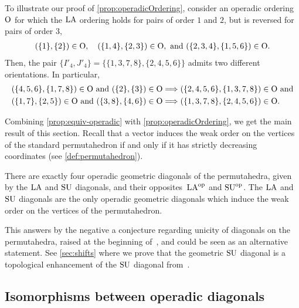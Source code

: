 \begin{example} 
\label{ex:Non-coherent order contradiction}
To illustrate our proof of \cref{prop:operadicOrdering}, consider an operadic ordering $\mathrm{O}$ for which the $\mathrm{LA}$ ordering holds for pairs of order $1$ and $2$, but is reversed for pairs of order $3$, \ie
\begin{align*}
(\{1\}, \{2\}) \in \mathrm{O}, \quad (\{1,4\}, \{2,3\}) \in \mathrm{O}, \text{ and } (\{2, 3, 4\}, \{1, 5, 6 \}) \in \mathrm{O}.
\end{align*}
Then, the pair $\{I'_4,J'_4\}=\{\{1, 3, 7, 8\}, \{2, 4, 5, 6\}\}$ admits two different orientations.
In particular, 
\begin{align*}
(\{ 4, 5, 6 \} , \{1, 7, 8\}) \in \Or \text{ and } (\{2\}, \{3\}) \in \Or & \Longrightarrow (\{2, 4, 5, 6\}, \{1, 3, 7, 8\} ) \in \Or \ \text{and} \\
(\{1, 7\}, \{2, 5\}) \in \Or \text{ and } (\{3, 8\}, \{4, 6\}) \in \Or & \Longrightarrow (\{1, 3, 7, 8\}, \{2, 4, 5, 6\}) \in \Or.
\end{align*}
\end{example}

Combining \cref{prop:equiv-operadic} with \cref{prop:operadicOrdering}, we get the main result of this section.
Recall that a vector induces the weak order on the vertices of the standard permutahedron if and only if it has strictly decreasing coordinates (see \cref{def:permutahedron}).

\begin{theorem}
\label{thm:unique-operadic}
There are exactly four operadic geometric diagonals of the permutahedra, given by the $\mathrm{LA}$ and $\mathrm{SU}$ diagonals, and their opposites~$\mathrm{LA}^{\mathrm{op}}$ and $\mathrm{SU}^{\mathrm{op}}$. 
The $\mathrm{LA}$ and $\mathrm{SU}$ diagonals are the only operadic geometric diagonals which induce the weak order on the vertices of the permutahedron.
\end{theorem}

\begin{remark}
This answers by the negative a conjecture regarding unicity of diagonals on the permutahedra, raised at the beginning of~\cite[Sect.~3]{SaneblidzeUmble}, and could be seen as an alternative statement. 
See \cref{sec:shifts} where we prove that the geometric $\mathrm{SU}$ diagonal is a topological enhancement of the $\mathrm{SU}$ diagonal from~\cite{SaneblidzeUmble}.
\end{remark}


\subsection{Isomorphisms between operadic diagonals}
\label{subsec:isos-LA-SU}

